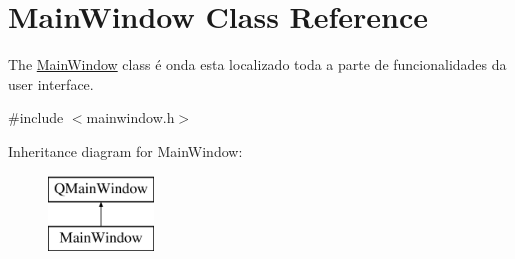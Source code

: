 \hypertarget{class_main_window}{}\section{Main\+Window Class Reference}
\label{class_main_window}


The \mbox{\hyperlink{class_main_window}{Main\+Window}} class é onda esta localizado toda a parte de funcionalidades da user interface.  




{\ttfamily \#include $<$mainwindow.\+h$>$}

Inheritance diagram for Main\+Window\+:\begin{figure}[H]
\begin{center}
\leavevmode
\includegraphics[height=2.000000cm]{class_main_window}
\end{center}
\end{figure}
